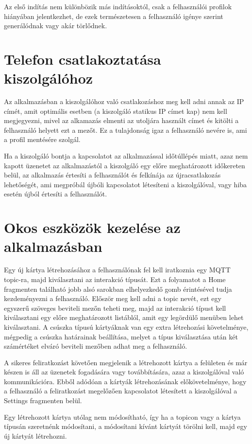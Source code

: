 \documentclass[
]{thesis-ekf}
\theoremstyle{definition}
\theoremstyle{remark}
\begin{document}
Az első indítás nem különbözik más indításoktól, csak a felhasználói profilok hiányában jelentkezhet, de ezek
természetesen a felhasználó igénye szerint generálódnak vagy akár törlődnek.

\section{Telefon csatlakoztatása kiszolgálóhoz}
Az alkalmazásban a kiszolgálóhoz való csatlakozáshoz meg kell adni annak az IP címét, amit optimális esetben
(a kiszolgáló statikus IP címet kap) nem kell megjegyezni, mivel az alkamazás elmenti az utoljára használt címet
és kitölti a felhasználó helyett ezt a mezőt. Ez a tulajdonság igaz a felhasználó nevére is, ami a profil mentésére
szolgál.

Ha a kiszolgáló bontja a kapcsolatot az alkalmazással időtúllépés miatt, azaz nem kapott üzenetet az alkalmazástól
a kiszolgáló egy előre meghatározott időkereten belül, az alkalmazás értesíti a felhasználót és felkínája
az újracsatlakozás lehetőségét, ami megpróbál újbóli kapcsolatot létesíteni a kiszolgálóval, vagy hiba esetén
újból értesíti a felhasználót.

\section{Okos eszközök kezelése az alkalmazásban}
Egy új kártya létrehozásához a felhasználónak fel kell iratkoznia egy MQTT topic-ra, majd kiválasztani az interakció
típusát. Ezt a folyamatot a Home fragmenten található jobb alsó sarokban elhelyezkedő gomb érintésével
tudja kezdeményezni a felhasználó. Először meg kell adni a topic nevét, ezt egy egyszerű szöveges beviteli mezőn
teheti meg, majd az interakció típust kell kiválasztani egy előre meghatározott listáblól, amit egy legördülő
menüben lehet kiválasztani. A csúszka típusú kártyáknak van egy extra létrehozási követelménye, mégpedig a
csúszka határainak beállítása, melyet a típus kiválasztása után két számértéket elváró beviteli mezőben adhat
meg a felhasználó.

A sikeres feliratkozást követően megjelenik a létrehozott kártya a felületen és már készen is áll az üzenetek
fogadására vagy továbbítására, azaz a kiszolgálóval való kommunikációra. Ebből adódóan a kártyák létrehozásának
előkövetelménye, hogy a felhasználó a feliratkozást megelőzően kapcsolatot létesített a kiszolgálóval a Settings 
fragmenten belül.

Egy létrehozott kártya utólag nem módosítható, így ha a topicon vagy a kártya típusán szeretnénk módosítani,
a módosítani kívánt kártyát törölni kell, majd egy új kártyát létrehozni.
\end{document}
